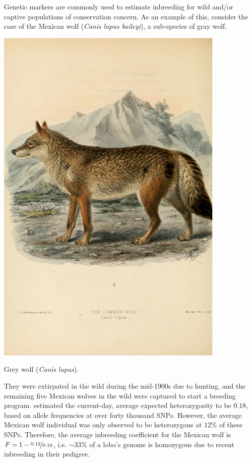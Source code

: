 {{Genetic markers are commonly used to estimate inbreeding for wild and/or captive populations of conservation concern. As an example of this, consider the case of the Mexican wolf ({\it Canis lupus baileyi}), a sub-species of gray wolf. \begin{marginfigure}[-2cm]
\begin{center}
  \includegraphics[width= \textwidth]{illustration_images/alleles_genotypes/grey_wolf/5988399184_0c36a8e51c_z.jpg}
\end{center}
\caption{Grey wolf ({\it Canis lupus}). } \label{fig:Grey_wolf}
\end{marginfigure}
They were extirpated in the wild during the mid-1900s due to hunting, and the remaining five Mexican wolves in the wild were captured to start a breeding program. \citet{vonHoldt:11} estimated the current-day, average expected heterozygosity to be $0.18$, based on allele frequencies at over forty thousand SNPs. However, the average Mexican wolf individual was only observed to be heterozygous at $12\%$ of these SNPs. Therefore, the average inbreeding coefficient for the Mexican wolf is $F = 1 -\nicefrac{0.12}{0.18}$, i.e. $\sim 33 \%$ of a lobo's genome is homozygous due to recent inbreeding in their pedigree.

}}
